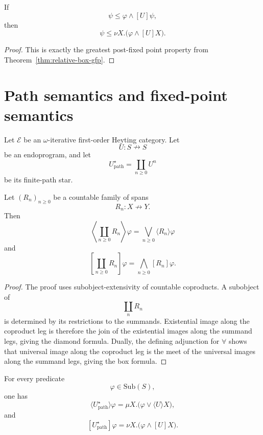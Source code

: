 \begin{corollary}
\label{cor:relative-box-coinduction}
If
\[
\psi\le \varphi\wedge[U]\psi,
\]
then
\[
\psi\le
\nu X.\bigl(\varphi\wedge[U]X\bigr).
\]
\end{corollary}

\begin{proof}
This is exactly the greatest post-fixed point property from
Theorem~\ref{thm:relative-box-gfp}.
\end{proof}

\section{Path semantics and fixed-point semantics}
\label{sec:relative-path-fixed-point-comparison}

Let \(\mathcal E\) be an \(\omega\)-iterative first-order Heyting category.
Let
\[
U:S\nrightarrow S
\]
be an endoprogram, and let
\[
U^\star_{\mathrm{path}}
=
\coprod_{n\ge0}U^n
\]
be its finite-path star.

\begin{proposition}
\label{prop:relative-coproduct-modalities}
Let \((R_n)_{n\ge0}\) be a countable family of spans
\[
R_n:X\nrightarrow Y.
\]
Then
\[
\left\langle\coprod_{n\ge0}R_n\right\rangle\varphi
=
\bigvee_{n\ge0}\langle R_n\rangle\varphi
\]
and
\[
\left[\coprod_{n\ge0}R_n\right]\varphi
=
\bigwedge_{n\ge0}[R_n]\varphi.
\]
\end{proposition}

\begin{proof}
The proof uses subobject-extensivity of countable coproducts. A subobject of
\[
\coprod_n R_n
\]
is determined by its restrictions to the summands. Existential image along the
coproduct leg is therefore the join of the existential images along the
summand legs, giving the diamond formula. Dually, the defining adjunction for
\(\forall\) shows that universal image along the coproduct leg is the meet of
the universal images along the summand legs, giving the box formula.
\end{proof}

\begin{theorem}
\label{thm:relative-path-fixed-point-comparison}
For every predicate
\[
\varphi\in\mathrm{Sub}(S),
\]
one has
\[
\langle U^\star_{\mathrm{path}}\rangle\varphi
=
\mu X.\bigl(\varphi\vee\langle U\rangle X\bigr),
\]
and
\[
[U^\star_{\mathrm{path}}]\varphi
=
\nu X.\bigl(\varphi\wedge[U]X\bigr).
\]
\end{theorem}

